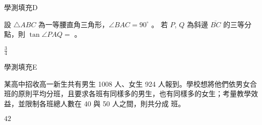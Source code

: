     \begin{QUESTION}
        \begin{ExamInfo}{93}{學測}{填充}{D}
        \end{ExamInfo}
        \begin{ExamAnsRateInfo}{19}{45}{8}{4}
        \end{ExamAnsRateInfo}
        \begin{QBODY}
            設 $\triangle ABC$ 為一等腰直角三角形，$\angle BAC = 90^\circ$ 。
            若 $P$, $Q$ 為斜邊 $\overline{BC}$ 的三等分點，則 $\tan \angle PAQ = $
            \TCNBOX{\TCN\TCN} 。
        \end{QBODY}
        \begin{QFROMS}
        \end{QFROMS}
        \begin{QTAGS}\end{QTAGS}
        \begin{QANS}
            $\frac{3}{4}$
        \end{QANS}
        \begin{QSOLLIST}
        \end{QSOLLIST}
        \begin{QEMPTYSPACE}
        \end{QEMPTYSPACE}
    \end{QUESTION}
    \begin{QUESTION}
        \begin{ExamInfo}{93}{學測}{填充}{E}
        \end{ExamInfo}
        \begin{ExamAnsRateInfo}{52}{77}{56}{23}
        \end{ExamAnsRateInfo}
        \begin{QBODY}
            某高中招收高一新生共有男生 1008 人、女生 924 人報到。學校想將他們依男女合班的原則平均分班，且要求各班有同樣多的男生，也有同樣多的女生；考量教學效益，並限制各班總人數在 40 與 50 人之間，則共分成	
            \TCNBOX{\TCN\TCN} 班。
        \end{QBODY}
        \begin{QFROMS}
        \end{QFROMS}
        \begin{QTAGS}\end{QTAGS}
        \begin{QANS}
            $42$
        \end{QANS}
        \begin{QSOLLIST}
        \end{QSOLLIST}
        \begin{QEMPTYSPACE}
        \end{QEMPTYSPACE}
    \end{QUESTION}
